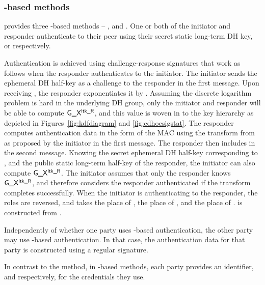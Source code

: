 \subsubsection{\mStat-based methods}
\mEdhoc{} provides three \mStat-based methods -- \mSigStat{}, \mStatStat{} and \mStatSig{}. One or both of the initiator and responder authenticate to their peer using their secret static long-term DH key, \mLtki{} or \mLtkr{} respectively.
%

Authentication is achieved using challenge-response signatures that work as follows when the responder authenticates to the initiator.
%
The initiator sends the ephemeral DH half-key \mGx{} as a challenge to the responder in the first message.
%
%
Upon receiving \mGx{}, the responder exponentiates it by \mLtkr{}.
%
Assuming the discrete logarithm problem is hard in the underlying DH group, only the initiator and responder will be able to compute $\text{\textup{\textsf{G\_X}}}{}^{\text{\textup{\textsf{ltk\_R}}}}{}$, and this value is woven in to the key hierarchy as depicted in Figures~\ref{fig:kdfdiagram} and \ref{fig:edhocsigstat}.
%
The responder computes authentication data \mAuthr{} in the form of the MAC \mMactwo{} using the \mAead{} transform from \mSuites{} as proposed by the initiator in the first message.
%
The responder then includes \mMactwo{} in the second message.
%
Knowing the secret ephemeral DH half-key corresponding to \mGx{}, and the public static long-term half-key of the responder, the initiator can also compute $\text{\textup{\textsf{G\_X}}}{}^{\text{\textup{\textsf{ltk\_R}}}}{}$.
%
The initiator assumes that only the responder knows $\text{\textup{\textsf{G\_X}}}{}^{\text{\textup{\textsf{ltk\_R}}}}{}$, and therefore considers the responder authenticated if the \mAead{} transform completes successfully.
%
When the initiator is authenticating to the responder, the roles are reversed, and \mGy{} takes the place of \mGx{}, \mLtki{} the place of \mLtkr{}, and \mAuthi{} the place of \mAuthr{}. \mAuthi{} is constructed from \mMacthree{}.
%

Independently of whether one party uses \mStat{}-based authentication, the other party may use \mSig{}-based authentication. In that case, the authentication data for that party is constructed using a regular signature.
%

In contrast to the \mPskPsk{} method, in \mStat{}-based methods, each party provides an identifier, \mIdcredi{} and \mIdcredr{} respectively, for the credentials they use.
%
%

\spacehack
